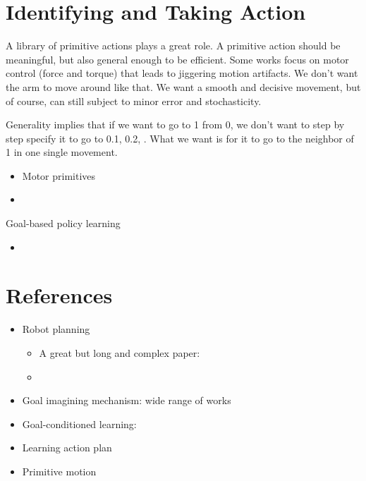 \section{Identifying and Taking Action}
A library of primitive actions plays a great role. A primitive action should be meaningful, but also general enough to be efficient. Some works focus on motor control (force and torque) that leads to jiggering motion artifacts. We don't want the arm to move around like that. We want a smooth and decisive movement, but of course, can still subject to minor error and stochasticity.

Generality implies that if we want to go to 1 from 0, we don't want to step by step specify it to go to 0.1, 0.2, \etc. What we want is for it to go to the neighbor of 1 in one single movement.

\begin{itemize}
	\item Motor primitives 
	\item \todo{}
\end{itemize}

Goal-based policy learning
\begin{itemize}
	\item 
\end{itemize}

\section{References}
\todo{}
\begin{itemize}
	\item Robot planning
	\begin{itemize}
		\item \note A great but long and complex paper: 
		\item {}
	\end{itemize}
	\item Goal imagining mechanism: wide range of works
	\item Goal-conditioned learning:
	\item Learning action plan
	\item Primitive motion
\end{itemize}
